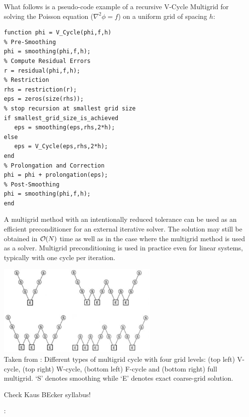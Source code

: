 What follows is a pseudo-code example of a recursive V-Cycle Multigrid for solving 
the Poisson equation ($\nabla^2 \phi = f$) 
on a uniform grid of spacing $h$:

\begin{verbatim}
function phi = V_Cycle(phi,f,h)
% Pre-Smoothing
phi = smoothing(phi,f,h);
% Compute Residual Errors
r = residual(phi,f,h);
% Restriction
rhs = restriction(r);
eps = zeros(size(rhs));
% stop recursion at smallest grid size
if smallest_grid_size_is_achieved
   eps = smoothing(eps,rhs,2*h);
else        
   eps = V_Cycle(eps,rhs,2*h);        
end
% Prolongation and Correction
phi = phi + prolongation(eps);
% Post-Smoothing
phi = smoothing(phi,f,h);    
end
\end{verbatim}

A multigrid method with an intentionally reduced tolerance can be used as an efficient preconditioner for an external iterative solver. The solution may still be obtained in ${\cal O}(N)$ time as well as in the case where the multigrid method is used as a solver. Multigrid preconditioning is used in practice even for linear systems, typically with one cycle per iteration.

\begin{center}
\includegraphics[width=8cm]{images/multigrid/cycles}\\
{\scriptsize Taken from \cite{tack10}: Different types of multigrid cycle with four grid levels: (top left) V-cycle, (top right) W-cycle,
(bottom left) F-cycle and (bottom right) full multigrid. ‘S’ denotes smoothing while ‘E’ denotes
exact coarse-grid solution.}
\end{center} 

Check Kaus BEcker syllabus!

\Literature: \cite{tack10,gery10,mabl15}
